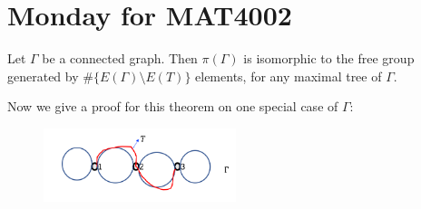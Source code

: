 \section{Monday for MAT4002}


\begin{theorem}
Let $\Gamma$ be a connected graph.
Then $\pi(\Gamma)$ is isomorphic to the free group generated by $\#\{E(\Gamma)\setminus E(T)\}$ elements,
for any maximal tree of $\Gamma$.
\end{theorem}
Now we give a proof for this theorem on one special case of $\Gamma$:
\begin{figure}[H]
\centering
\includegraphics[width=0.5\textwidth]{week14/f_28}
\end{figure}
